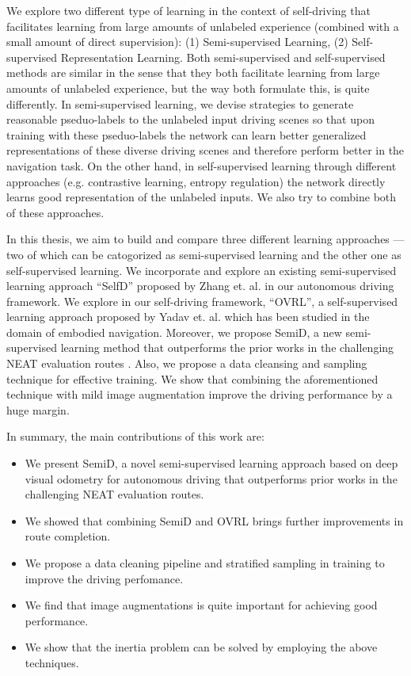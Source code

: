 \documentclass[letterpaper, 12pt]{book}
\theoremstyle{definition}
\theoremstyle{definition}
\theoremstyle{definition}
\theoremstyle{definition}
\theoremstyle{definition}
\begin{document}
We explore two different type of learning in the context of self-driving that
facilitates learning from large amounts of unlabeled experience (combined with a
small amount of direct supervision): (1) Semi-supervised Learning, (2)
Self-supervised Representation Learning. Both semi-supervised and
self-supervised methods are similar in the sense that they both facilitate
learning from large amounts of unlabeled experience, but the way both formulate
this, is quite differently. In semi-supervised learning, we devise strategies to
generate reasonable pseduo-labels to the unlabeled input driving scenes so that
upon training with these pseduo-labels the network can learn better generalized
representations of these diverse driving scenes and therefore perform better in
the navigation task. On the other hand, in self-supervised learning through
different approaches (e.g. contrastive learning, entropy regulation) the network
directly learns good representation of the unlabeled inputs. We also try to
combine both of these approaches.

In this thesis, we aim to build and compare three different learning approaches
--- two of which can be catogorized as semi-supervised learning and the other
one as self-supervised learning. We incorporate and explore an existing
semi-supervised learning approach ``SelfD'' proposed by Zhang
et. al. \cite{Zhang2022a} in our autonomous driving framework. We explore in our
self-driving framework, ``OVRL'', a self-supervised learning approach proposed
by Yadav et. al. \cite{Yadav2022} which has been studied in the domain of
embodied navigation. Moreover, we propose SemiD, a new semi-supervised learning
method that outperforms the prior works in the challenging NEAT evaluation
routes \cite{Chitta2021}. Also, we propose a data cleansing and sampling
technique for effective training. We show that combining the aforementioned
technique with mild image augmentation improve the driving performance by a huge
margin.


In summary, the main contributions of this work are:
\begin{itemize}
\item We present SemiD, a novel semi-supervised learning approach based on deep
visual odometry for autonomous driving that outperforms prior works in the
challenging NEAT evaluation routes.
\item We showed that combining SemiD and OVRL brings further improvements in route
completion.
\item We propose a data cleaning pipeline and stratified sampling in training to
improve the driving perfomance.
\item We find that image augmentations is quite important for achieving good performance.
\item We show that the inertia problem can be solved by employing the above techniques.
\end{itemize}
\end{document}
